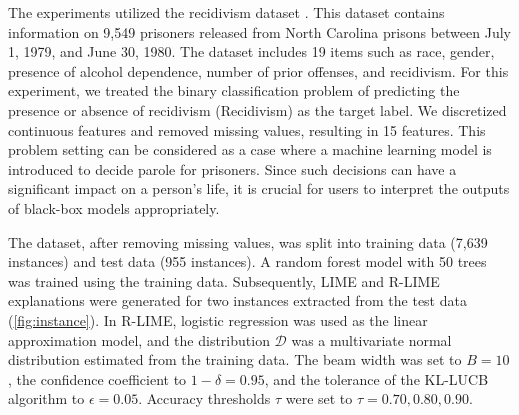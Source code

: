 \documentclass[runningheads]{llncs}
\begin{document}
The experiments utilized the recidivism dataset \cite{schmidt1988predicting}.
This dataset contains information on 9,549 prisoners released from
North Carolina prisons between July 1, 1979, and June 30, 1980.
The dataset includes 19 items such as race, gender,
presence of alcohol dependence, number of prior offenses, and recidivism.
For this experiment,
we treated the binary classification problem of predicting
the presence or absence of recidivism (Recidivism) as the target label.
We discretized continuous features and removed missing values,
resulting in 15 features.
This problem setting can be considered as a case
where a machine learning model is introduced to decide parole for prisoners.
Since such decisions can have a significant impact on a person's life,
it is crucial for users to interpret the outputs of black-box models appropriately.

The dataset, after removing missing values,
was split into training data (7,639 instances) and test data (955 instances).
A random forest model with 50 trees was trained using the training data.
Subsequently, LIME and R-LIME explanations were generated
for two instances extracted from the test data (\cref{fig:instance}).
In R-LIME, logistic regression was used as the linear approximation model,
and the distribution $\mathcal{D}$ was a multivariate normal distribution
estimated from the training data.
The beam width was set to $B=10$,
the confidence coefficient to $1-\delta=0.95$,
and the tolerance of the KL-LUCB algorithm to $\epsilon=0.05$.
Accuracy thresholds $\tau$ were set to $\tau=0.70,0.80,0.90$.
\end{document}
